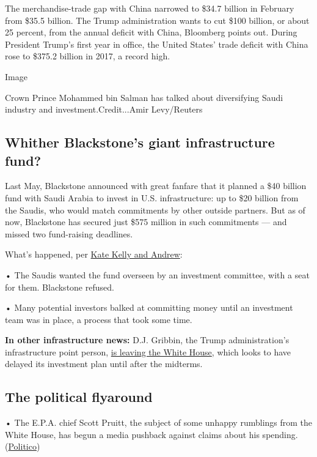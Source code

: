 The merchandise-trade gap with China narrowed to \$34.7 billion in
February from \$35.5 billion. The Trump administration wants to cut
\$100 billion, or about 25 percent, from the annual deficit with China,
Bloomberg points out. During President Trump's first year in office, the
United States' trade deficit with China rose to \$375.2 billion in 2017,
a record high.

Image

Crown Prince Mohammed bin Salman has talked about diversifying Saudi
industry and investment.Credit...Amir Levy/Reuters

\hypertarget{whither-blackstones-giant-infrastructure-fund}{%
\subsection{Whither Blackstone's giant infrastructure
fund?}\label{whither-blackstones-giant-infrastructure-fund}}

Last May, Blackstone announced with great fanfare that it planned a \$40
billion fund with Saudi Arabia to invest in U.S. infrastructure: up to
\$20 billion from the Saudis, who would match commitments by other
outside partners. But as of now, Blackstone has secured just \$575
million in such commitments --- and missed two fund-raising deadlines.

What's happened, per
\href{https://www.nytimes3xbfgragh.onion/2018/04/04/business/blackstone-infrastructure-fund-saudi.html?dlbk}{Kate
Kelly and Andrew}:

• The Saudis wanted the fund overseen by an investment committee, with a
seat for them. Blackstone refused.

• Many potential investors balked at committing money until an
investment team was in place, a process that took some time.

\textbf{In other infrastructure news:} D.J. Gribbin, the Trump
administration's infrastructure point person,
\href{https://apnews.com/1b0b9aafef6c416a85c1a71d7d80b7c3}{is leaving
the White House}, which looks to have delayed its investment plan until
after the midterms.

\hypertarget{the-political-flyaround}{%
\subsection{The political flyaround}\label{the-political-flyaround}}

• The E.P.A. chief Scott Pruitt, the subject of some unhappy rumblings
from the White House, has begun a media pushback against claims about
his spending.
(\href{https://www.politico.com/story/2018/04/04/scott-pruitt-trump-epa-job-456900?dlbk}{Politico})

